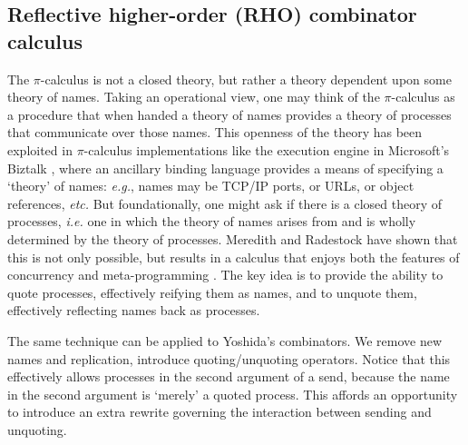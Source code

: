 \documentclass[submission,copyright,creativecommons]{eptcs}
\makeatletter
\newcommand{\pic}{$\pi$-calculus}
\newcommand{\quotep}[1]{\mathsf{@}#1}
\newcommand{\bc}{\mathbin{\mathbf{::=}}}
\newcommand{\bm}{\mathbin{\mathbf\mid}}
\theoremstyle{definition}
\theoremstyle{remark}
\theoremstyle{remark}
\makeatother
\begin{document}
\subsection{Reflective higher-order (RHO) combinator calculus}
The {\pic} is not a closed theory, but rather a theory dependent upon
some theory of names. Taking an operational view, one may think of the
{\pic} as a procedure that when handed a theory of names provides a
theory of processes that communicate over those names. This openness
of the theory has been exploited in {\pic} implementations like the
execution engine in Microsoft's Biztalk \cite{biztalk}, where an
ancillary binding language provides a means of specifying a `theory'
of names: {\em e.g.}, names may be TCP/IP ports, or URLs, or object
references, {\em etc.}  But foundationally, one might ask if there is
a closed theory of processes, {\em i.e.} one in which the theory of
names arises from and is wholly determined by the theory of
processes. Meredith and Radestock have shown that this is not only
possible, but results in a calculus that enjoys both the features of
concurrency and meta-programming
\cite{DBLP:journals/entcs/MeredithR05}. The key idea is to provide the
ability to quote processes, effectively reifying them as names, and to
unquote them, effectively reflecting names back as processes.

The same technique can be applied to Yoshida's combinators. We remove
new names and replication, introduce quoting/unquoting
operators. Notice that this effectively allows processes in the second
argument of a send, because the name in the second argument is
`merely' a quoted process. This affords an opportunity to introduce an
extra rewrite governing the interaction between sending and unquoting.

\end{document}
